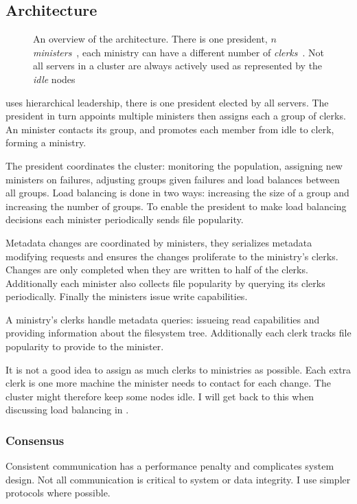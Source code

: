 \subsection{Architecture} \label{sec:arch}
\begin{figure}
	
	\caption{An overview of the architecture. There is one president, $n$ \emph{ministers}~\amdsLeg{}, each ministry can have a different number of \emph{clerks}~\cmdsLeg{}. Not all servers in a cluster are always actively used as represented by the \emph{idle} nodes~\umdsLeg{}}
\end{figure}

\Name{} uses hierarchical leadership, there is one president elected by all servers. The president in turn appoints multiple ministers then assigns each a group of clerks. An minister contacts its group, and promotes each member from idle to clerk, forming a ministry. 

The president coordinates the cluster: monitoring the population, assigning new ministers on failures, adjusting groups given failures and load balances between all groups. Load balancing is done in two ways: increasing the size of a group and increasing the number of groups. To enable the president to make load balancing decisions each minister periodically sends file popularity.

Metadata changes are coordinated by ministers, they serializes metadata modifying requests and ensures the changes proliferate to the ministry's clerks. Changes are only completed when they are written to half of the clerks. Additionally each minister also collects file popularity by querying its clerks periodically. Finally the ministers issue write capabilities.

A ministry's clerks handle metadata queries: issueing read capabilities and providing information about the filesystem tree. Additionally each clerk tracks file popularity to provide to the minister. 

It is not a good idea to assign as much clerks to ministries as possible. Each extra clerk is one more machine the minister needs to contact for each change. The cluster might therefore keep some nodes idle. I will get back to this when discussing load balancing in .
%
\subsubsection*{Consensus} \label{sec:concensus} \label{sec:praft}
Consistent communication has a performance penalty and complicates system design. Not all communication is critical to system or data integrity. I use simpler protocols where possible. 


